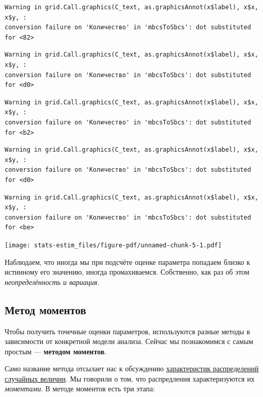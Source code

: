 \documentclass[
  letterpaper,
  DIV=11,
  numbers=noendperiod]{scrreprt}
\theoremstyle{definition}
\theoremstyle{remark}
\begin{document}
\begin{verbatim}
Warning in grid.Call.graphics(C_text, as.graphicsAnnot(x$label), x$x, x$y, :
conversion failure on 'Количество' in 'mbcsToSbcs': dot substituted for <82>
\end{verbatim}

\begin{verbatim}
Warning in grid.Call.graphics(C_text, as.graphicsAnnot(x$label), x$x, x$y, :
conversion failure on 'Количество' in 'mbcsToSbcs': dot substituted for <d0>
\end{verbatim}

\begin{verbatim}
Warning in grid.Call.graphics(C_text, as.graphicsAnnot(x$label), x$x, x$y, :
conversion failure on 'Количество' in 'mbcsToSbcs': dot substituted for <b2>
\end{verbatim}

\begin{verbatim}
Warning in grid.Call.graphics(C_text, as.graphicsAnnot(x$label), x$x, x$y, :
conversion failure on 'Количество' in 'mbcsToSbcs': dot substituted for <d0>
\end{verbatim}

\begin{verbatim}
Warning in grid.Call.graphics(C_text, as.graphicsAnnot(x$label), x$x, x$y, :
conversion failure on 'Количество' in 'mbcsToSbcs': dot substituted for <be>
\end{verbatim}

\texttt{[image: stats-estim\_files/figure-pdf/unnamed-chunk-5-1.pdf]}

Наблюдаем, что иногда мы при подсчёте оценке параметра попадаем близко к
истинному его значению, иногда промахиваемся. Собственно, как раз об
этом \emph{неопределённость и вариация}.

\subsection{Метод
моментов}\label{ux43cux435ux442ux43eux434-ux43cux43eux43cux435ux43dux442ux43eux432}

Чтобы получить точечные оценки параметров, используются разные методы в
зависимости от конкретной модели анализа. Сейчас мы познакомимся с самым
простым --- \textbf{методом моментов}.

Само название метода отсылает нас к обсуждению
\hyperref[moments_distributions]{характеристик распределений случайных
величин}. Мы говорили о том, что распредления характеризуются их
\emph{моментами}. В методе моментов есть три этапа:
\end{document}
